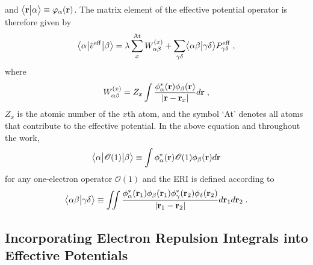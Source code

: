 \documentclass[aip,jcp,amsmath,amssymb,reprint,floatfix]{revtex4-1}
\begin{document}
%
and $\bigl\langle {\bf r} \bigl\lvert {\alpha} \bigr\rangle \equiv \varphi_\alpha({\bf r})$.
The matrix element of the effective potential operator
is therefore given by
%
\begin{equation} \label{e:oep-matrix-element}
	\bigl\langle {\alpha} \bigl\lvert { \hat{v}^{\rm eff} } \bigl\lvert {\beta} \bigr\rangle
	= \lambda \sum_x^{\rm At} W_{\alpha\beta}^{(x)} +
        \sum_{\gamma\delta} \bigl\langle {\alpha\beta} \bigl\lvert {\gamma\delta} \bigr\rangle P^{\rm eff}_{\gamma\delta}  \;,
\end{equation}
%
where 
%
\begin{equation} \label{e:oep-matrix-element-nuc}
 W_{\alpha\beta}^{(x)} = 
 Z_x \int \frac{\phi^*_\alpha({\bf r}) \phi_\beta({\bf r})}{\vert {\bf r} - {\bf r}_x \vert} d{\bf r} \;,
\end{equation}
%
$Z_x$ is the atomic number of the $x$th atom,
and the symbol `At' denotes all atoms that contribute to the effective potential.
In the above equation and throughout the work, 
%
\begin{equation} \label{e:1el-operator}
\bigl\langle {\alpha} \bigl\lvert {\mathscr{O}(1)} \bigl\lvert {\beta} \bigr\rangle \equiv \int \phi^*_\alpha({\bf r}) \mathscr{O}(1) \phi_\beta({\bf r}) d{\bf r} 
\end{equation}
%
for any one\hyp{}electron operator $\mathscr{O}(1)$ 
and the ERI
is defined according to
%
\begin{equation} \label{e:eri}
	\bigl\langle {\alpha\beta} \bigl\lvert {\gamma\delta} \bigr\rangle \equiv
	\iint 
	\frac{ \phi_\alpha^{*}({\bf r}_1) \phi_\beta({\bf r}_1) 
	       \phi_\gamma^{*}({\bf r}_2) \phi_\delta({\bf r}_2) }{ \vert {\bf r}_1 - {\bf r}_2 \vert}
	d{\bf r}_1 d{\bf r}_2  \;.
\end{equation}
%

\subsection{\label{ss:2.1.oep-technique}Incorporating Electron Repulsion Integrals into Effective Potentials}
\end{document}
